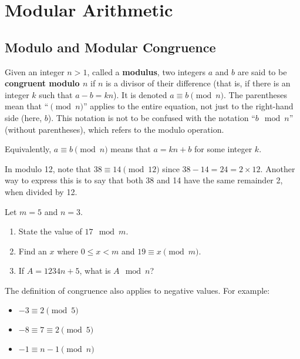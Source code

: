 \chapter{Modular Arithmetic}
\section{Modulo and Modular Congruence}

Given an integer $n>1$, called a \textbf{modulus}, two integers $a$ and $b$ are said to be \textbf{congruent modulo $n$} if $n$ is a divisor of their difference (that is, if there is an integer $k$ such that $a - b = kn$). It is denoted $a \equiv b \pmod{n}$. The parentheses mean that ``$\pmod{n}$'' applies to the entire equation, not just to the right-hand side (here, $b$). This notation is not to be confused with the notation ``$b \mod n$'' (without parentheses), which refers to the modulo operation.
\begin{remark}
    Equivalently, $a \equiv b \pmod n$ means that $a = kn + b$ for some integer $k$.
\end{remark}
\begin{example}
    In modulo 12, note that $38 \equiv 14 \pmod{12}$ since $38 - 14 = 24 = 2 \times 12$. Another way to express this is to say that both 38 and 14 have the same remainder 2, when divided by 12.
\end{example}

\begin{exercise}
    Let $m = 5$ and $n = 3$.
    \begin{enumerate}[label=(\alph*)]
        \item State the value of $17 \mod m$.
        \item Find an $x$ where $0 \leq x < m$ and $19 \equiv x \pmod m$.
        \item If $A = 1234n + 5$, what is $A \mod n$?
    \end{enumerate}
\end{exercise}

The definition of congruence also applies to negative values. For example:
\begin{itemize}
    \item $-3 \equiv 2 \pmod5$
    \item $-8 \equiv 7 \equiv 2 \pmod5$
    \item $-1 \equiv n-1 \pmod{n}$
\end{itemize}

